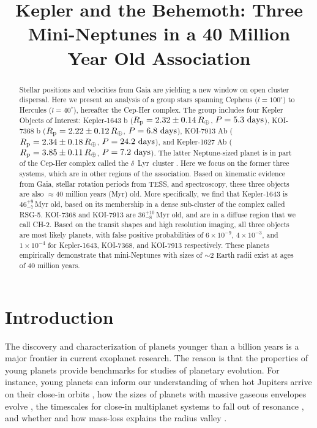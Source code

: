 \documentclass[12pt,twocolumn]{aastex63}
\begin{document}
\title{
  Kepler and the Behemoth: Three Mini-Neptunes in a 40 Million Year Old Association
}



\begin{abstract}
  Stellar positions and velocities from Gaia are yielding a new window
  on
  open cluster dispersal.  Here we present an analysis of a
  group stars spanning Cepheus ($l=100^\circ$) to Hercules
  ($l=40^\circ$), hereafter the Cep-Her complex.
  The group includes four Kepler Objects of Interest:
  Kepler-1643 b ($R_{\rm p} = 2.32 \pm 0.14\,R_\oplus$, $P = 5.3\ {\rm days}$),
  KOI-7368 b ($R_{\rm p} = 2.22 \pm 0.12\,R_\oplus$, $P = 6.8\ {\rm days}$), 
  KOI-7913 Ab ($R_{\rm p} = 2.34 \pm 0.18\,R_\oplus$, $P = 24.2\ {\rm days}$), and
  Kepler-1627 Ab ($R_{\rm p} = 3.85 \pm 0.11\,R_\oplus$, $P = 7.2\ {\rm days}$).
  The latter Neptune-sized planet is in part of the Cep-Her
  complex called the $\delta$\ Lyr\ cluster
  \citep{bouma_kep1627_2022}.  Here we focus on the former three
  systems, which are in other regions of the association.  Based on
  kinematic evidence from Gaia, stellar rotation periods from TESS,
  and spectroscopy, these three objects are also $\approx$40 million
  years (Myr) old.  More specifically, we find that Kepler-1643 is
  $46^{+9}_{-7}$\,Myr old, based on its membership in a dense
  sub-cluster of the complex called RSG-5.  KOI-7368 and KOI-7913 are
  $36^{+10}_{-8}$\,Myr old, and are in a diffuse region that we call
  CH-2.  Based on the transit shapes and high resolution imaging, all
  three objects are most likely planets, with false positive
  probabilities of $6\times10^{-9}$, $4\times10^{-3}$, and
  $1\times10^{-4}$ for Kepler-1643, KOI-7368, and KOI-7913
  respectively.  These planets empirically demonstrate that
  mini-Neptunes with sizes of $\sim$2 Earth radii exist at ages of
  40 million years.
\end{abstract}



\section{Introduction}

The discovery and characterization of planets younger than
a billion years is a major frontier in current exoplanet research.
The reason is that the properties of young planets provide benchmarks
for studies of planetary evolution.  For instance, young planets can
inform our understanding
of when hot Jupiters arrive on their close-in orbits
\citep{dawson_johnson_2018}, how the sizes of planets with massive
gaseous envelopes evolve \citep{rizzuto_tess_2020}, the timescales for
close-in multiplanet systems to fall out of resonance
\citep{arevalo_stability_2022,goldberg_architectures_2022}, and
whether and how mass-loss explains the radius valley
\citep{lopez_how_2012,Owen_Wu_2013,Fulton_et_al_2017,ginzburg_corepowered_2018,lee_primordial_2021}.
\end{document}
